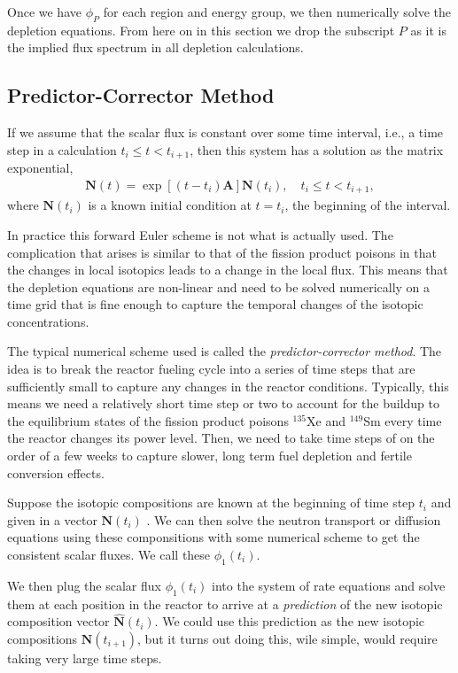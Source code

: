 Once we have $\phi_P$ for each region and energy group, we then numerically solve the depletion equations. From here on in this section we drop the subscript $P$ as it is the implied flux spectrum in all depletion calculations.





\subsection{Predictor-Corrector Method}

If we assume that the scalar flux is constant over some time interval, i.e., a time step in a calculation $t_i \le t < t_{i+1}$, then this system has a solution as the matrix exponential,
\begin{align}
  \mathbf{N}(t) = \exp\left[ (t-t_i) \mathbf{A} \right] \mathbf{N}(t_i) , \quad t_i \le t < t_{i+1} ,
\end{align}
where $\mathbf{N}(t_i)$ is a known initial condition at $t = t_i$, the beginning of the interval. 

In practice this forward Euler scheme is not what is actually used. The complication that arises is similar to that of the fission product poisons in that the changes in local isotopics leads to a change in the local flux. This means that the depletion equations are non-linear and need to be solved numerically on a time grid that is fine enough to capture the temporal changes of the isotopic concentrations. 

The typical numerical scheme used is called the \emph{predictor-corrector method}. The idea is to break the reactor fueling cycle into a series of time steps that are sufficiently small to capture any changes in the reactor conditions. Typically, this means we need a relatively short time step or two to account for the buildup to the equilibrium states of the fission product poisons $^{135}$Xe and $^{149}$Sm every time the reactor changes its power level. Then, we need to take time steps of on the order of a few weeks to capture slower, long term fuel depletion and fertile conversion effects.

Suppose the isotopic compositions are known at the beginning of time step $t_i$ and given in a vector $\mathbf{N}(t_i)$ . We can then solve the neutron transport or diffusion equations using these componsitions with some numerical scheme to get the consistent scalar fluxes. We call these $\phi_1(t_i)$.

We then plug the scalar flux $\phi_1(t_i)$ into the system of rate equations and solve them at each position in the reactor to arrive at a \emph{prediction} of the new isotopic composition vector $\hat{\mathbf{N}}(t_i)$. We could use this prediction as the new isotopic compositions $\mathbf{N}(t_{i+1})$, but it turns out doing this, wile simple, would require taking very large time steps.

